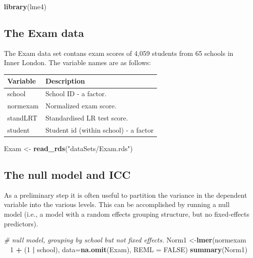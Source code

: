 \documentclass[]{book}
\newenvironment{Shaded}{\begin{snugshade}}{\end{snugshade}}
\newcommand{\KeywordTok}[1]{\textcolor[rgb]{0.13,0.29,0.53}{\textbf{#1}}}
\newcommand{\DataTypeTok}[1]{\textcolor[rgb]{0.13,0.29,0.53}{#1}}
\newcommand{\DecValTok}[1]{\textcolor[rgb]{0.00,0.00,0.81}{#1}}
\newcommand{\StringTok}[1]{\textcolor[rgb]{0.31,0.60,0.02}{#1}}
\newcommand{\CommentTok}[1]{\textcolor[rgb]{0.56,0.35,0.01}{\textit{#1}}}
\newcommand{\OtherTok}[1]{\textcolor[rgb]{0.56,0.35,0.01}{#1}}
\newcommand{\OperatorTok}[1]{\textcolor[rgb]{0.81,0.36,0.00}{\textbf{#1}}}
\newcommand{\NormalTok}[1]{#1}
\begin{document}
\begin{Shaded}
\begin{Highlighting}[]
  \KeywordTok{library}\NormalTok{(lme4)}
\end{Highlighting}
\end{Shaded}

\subsection{The Exam data}\label{the-exam-data}

The Exam data set contans exam scores of 4,059 students from 65 schools
in Inner London. The variable names are as follows:

\begin{longtable}[]{@{}ll@{}}
\toprule
Variable & Description\tabularnewline
\midrule
\endhead
school & School ID - a factor.\tabularnewline
normexam & Normalized exam score.\tabularnewline
standLRT & Standardised LR test score.\tabularnewline
student & Student id (within school) - a factor\tabularnewline
\bottomrule
\end{longtable}

\begin{Shaded}
\begin{Highlighting}[]
\NormalTok{  Exam <-}\StringTok{ }\KeywordTok{read_rds}\NormalTok{(}\StringTok{"dataSets/Exam.rds"}\NormalTok{)}
\end{Highlighting}
\end{Shaded}

\subsection{The null model and ICC}\label{the-null-model-and-icc}

As a preliminary step it is often useful to partition the variance in
the dependent variable into the various levels. This can be accomplished
by running a null model (i.e., a model with a random effects grouping
structure, but no fixed-effects predictors).

\begin{Shaded}
\begin{Highlighting}[]
  \CommentTok{# null model, grouping by school but not fixed effects.}
\NormalTok{  Norm1 <-}\KeywordTok{lmer}\NormalTok{(normexam }\OperatorTok{~}\StringTok{ }\DecValTok{1} \OperatorTok{+}\StringTok{ }\NormalTok{(}\DecValTok{1} \OperatorTok{|}\StringTok{ }\NormalTok{school),}
                \DataTypeTok{data=}\KeywordTok{na.omit}\NormalTok{(Exam), }\DataTypeTok{REML =} \OtherTok{FALSE}\NormalTok{)}
  \KeywordTok{summary}\NormalTok{(Norm1)}
\end{Highlighting}
\end{Shaded}
\end{document}
